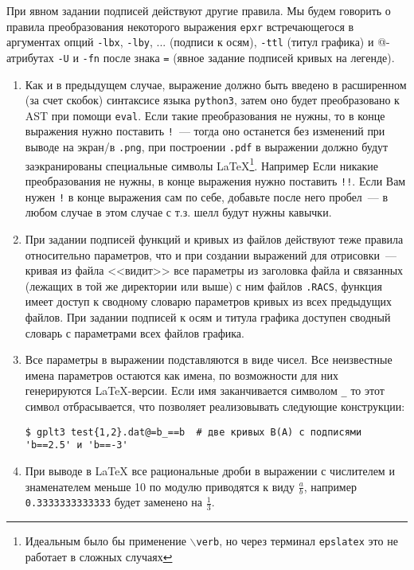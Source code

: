 \documentclass[12pt]{article}
\def\python{{\tt python3}}
\def\png{{\tt .png}}
\def\pdf{{\tt .pdf}}
\begin{document}
При явном задании подписей  действуют другие правила.
Мы будем говорить о правила преобразования некоторого выражения \verb'epxr' встречающегося в аргументах опций
\verb'-lbx', \verb'-lby', ... (подписи к осям),  \verb'-ttl' (титул графика) и @-атрибутах \verb'-U' и \verb'-fn' после знака \verb'='
(явное задание подписей кривых на легенде).   
\begin{enumerate}
\item Как и в предыдущем случае, выражение должно быть введено в расширенном (за счет скобок) синтаксисе языка \python,
  затем оно будет преобразовано к AST при помощи \verb'eval'. Если такие преобразования не нужны, то в конце выражения
  нужно поставить \verb'!'~--- тогда оно останется без изменений при выводе на экран/в \png, при построении \pdf{} в выражении
  должно будут заэкранированы специальные символы \LaTeX{}\footnote{Идеальным было бы применение {\tt $\backslash$verb}, но через терминал {\tt epslatex}
    это не работает в сложных случаях}. Например 
  Если никакие преобразования не нужны, в конце выражения нужно поставить \verb'!!'. Если Вам нужен \verb'!' в конце выражения сам по себе,
  добавьте после него пробел~--- в любом случае в этом случае с т.з. шелл будут нужны кавычки.
\item При задании подписей функций и кривых из файлов действуют теже правила относительно параметров, что и при создании выражений для отрисовки~---
  кривая из файла <<видит>> все параметры из заголовка файла и связанных (лежащих в той же директории или выше) с ним файлов \verb'.RACS',
  функция имеет доступ к сводному словарю параметров кривых из всех предыдущих файлов. При задании подписей к осям и титула графика
  доступен сводный словарь с параметрами всех файлов графика.
\item Все параметры в выражении подставляются в виде чисел.  Все неизвестные имена параметров остаются как имена, по возможности для них генерируются \LaTeX{}-версии.
  Если имя заканчивается символом \verb'_' то этот символ отбрасывается, что позволяет реализовывать следующие конструкции:
\begin{verbatim}
$ gplt3 test{1,2}.dat@=b_==b  # две кривых B(A) с подписями 'b==2.5' и 'b==-3'
\end{verbatim}
\item   При выводе в \LaTeX{} все рациональные дроби в выражении
  с числителем и знаменателем меньше 10 по модулю приводятся к виду $\frac ab$, например \verb'0.3333333333333' будет заменено на $\frac13$.
\end{enumerate}
\end{document}
